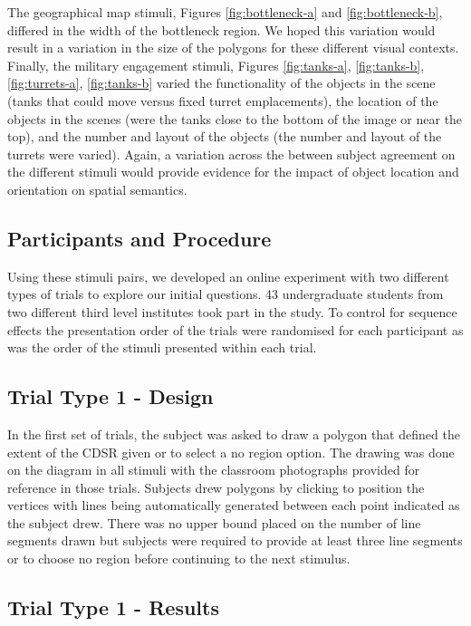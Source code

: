 \documentclass[11pt,letterpaper]{article}
\begin{document}
The geographical map stimuli, Figures \ref{fig:bottleneck-a} and \ref{fig:bottleneck-b}, differed in the width of the bottleneck region. We hoped this variation would result in a variation in the size of the polygons for these different visual contexts. Finally, the military engagement stimuli, Figures \ref{fig:tanks-a}, \ref{fig:tanks-b}, \ref{fig:turrets-a}, \ref{fig:tanks-b} varied the functionality of the objects in the scene (tanks that could move versus fixed turret emplacements), the location of the objects in the scenes (were the tanks close to the bottom of the image or near the top), and the number and layout of the objects (the number and layout of the turrets were varied). Again, a variation across the between subject agreement on the different stimuli would provide evidence for the impact of object location and orientation on spatial semantics.

\subsection{Participants and Procedure}
Using these stimuli pairs, we developed an online experiment with two different types of trials to explore our initial questions. 43 undergraduate students from two different third level institutes took part in the study. To control for sequence effects the presentation order of the trials were randomised for each participant as was the order of the stimuli presented within each trial.   

\subsection{Trial Type 1 - Design}
In the first set of trials, the subject was asked to draw a polygon that defined the extent of the CDSR given or to select a no region option.  The drawing was done on the diagram in all stimuli with the classroom photographs provided for reference in those trials.  Subjects drew polygons by clicking to position the vertices with lines being automatically generated between each point indicated as the subject drew.  There was no upper bound placed on the number of line segments drawn but subjects were required to provide at least three line segments or to choose no region before continuing to the next stimulus.

\subsection{Trial Type 1 - Results}
\end{document}

